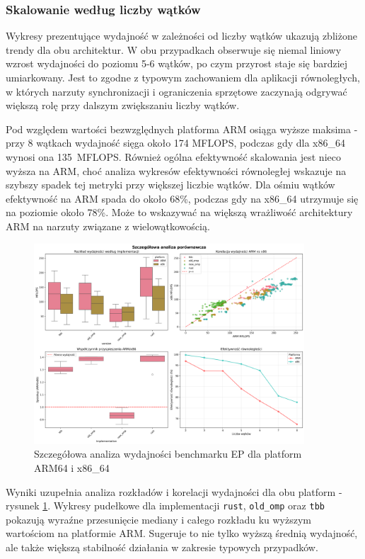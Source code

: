 \subsubsection{Skalowanie według liczby wątków}
Wykresy prezentujące wydajność w zależności od liczby wątków ukazują zbliżone trendy dla obu architektur. W obu przypadkach obserwuje się niemal liniowy wzrost wydajności do poziomu 5-6 wątków, po czym przyrost staje się bardziej umiarkowany. Jest to zgodne z typowym zachowaniem dla aplikacji równoległych, w których narzuty synchronizacji i ograniczenia sprzętowe zaczynają odgrywać większą rolę przy dalszym zwiększaniu liczby wątków.

Pod względem wartości bezwzględnych platforma ARM osiąga wyższe maksima - przy 8 wątkach wydajność sięga około 174 MFLOPS, podczas gdy dla x86\_64 wynosi ona \mbox{135 MFLOPS}. Również ogólna efektywność skalowania jest nieco wyższa na ARM, choć analiza wykresów efektywności równoległej wskazuje na szybszy spadek tej metryki przy większej liczbie wątków. Dla ośmiu wątków efektywność na ARM spada do około 68\%, podczas gdy na x86\_64 utrzymuje się na poziomie około 78\%. Może to wskazywać na większą wrażliwość architektury ARM na narzuty związane z wielowątkowością.
\begin{figure}[H]
    \centering
    \includegraphics[width=0.9\textwidth]{analiza/images/parallel/ep/compare/ep_szczegolowa_analiza_wydajnosci.png}
    \caption{Szczegółowa analiza wydajności benchmarku EP dla platform ARM64 i x86\_64}
    \label{ep_szczegolowa_analiza_wydajnosci}
\end{figure}

Wyniki uzupełnia analiza rozkładów i korelacji wydajności dla obu platform - rysunek \ref{ep_szczegolowa_analiza_wydajnosci}. Wykresy pudełkowe dla implementacji \texttt{rust}, \texttt{old\_omp} oraz \texttt{tbb} pokazują wyraźne przesunięcie mediany i całego rozkładu ku wyższym wartościom na platformie ARM. Sugeruje to nie tylko wyższą średnią wydajność, ale także większą stabilność działania w zakresie typowych przypadków.

